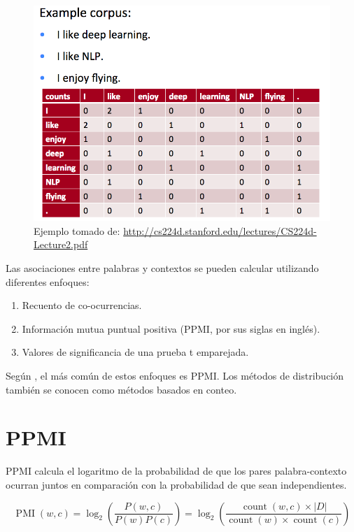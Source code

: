 \begin{figure}[htb]
\centering
\includegraphics[scale=0.3]{pics/distributionalSocher.png}
\caption{Ejemplo tomado de: \url{http://cs224d.stanford.edu/lectures/CS224d-Lecture2.pdf}}
\end{figure}



Las asociaciones entre palabras y contextos se pueden calcular utilizando diferentes enfoques:
\begin{enumerate}
    \item Recuento de co-ocurrencias.
    \item Información mutua puntual positiva (PPMI, por sus siglas en inglés).
    \item Valores de significancia de una prueba t emparejada.
\end{enumerate}
Según \cite{JurafskyBook}, el más común de estos enfoques es PPMI.
Los métodos de distribución también se conocen como métodos basados en conteo.

\section{PPMI}
PPMI calcula el logaritmo de la probabilidad de que los pares palabra-contexto ocurran juntos en comparación con la probabilidad de que sean independientes.

\begin{equation}
 \operatorname{PMI}(w, c)= \log_2 \left( \frac{P(w,c)}{P(w)P(c)} \right) = \log_{2} \left ( \frac{\operatorname{count}(w,c)\times |D|}{\operatorname{count}(w)\times \operatorname{count}(c)} \right ) 
\end{equation}


